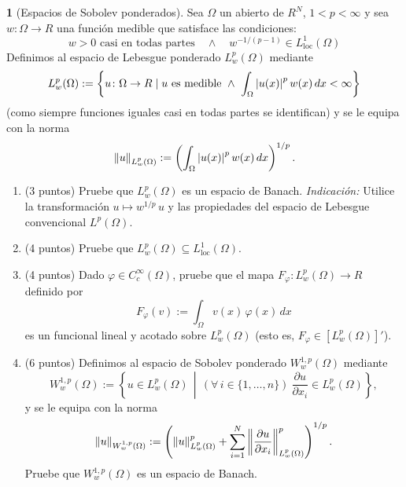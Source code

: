 \documentclass[10pt,a4paper]{report}
\newcommand{\abs}[2][y]{\if#1y\left\fi\lvert#2\if#1y\right\fi\rvert}
\newcommand{\norm}[2][y]{{\if#1y\left\fi\lVert#2\if#1y\right\fi\rVert}}
\newcommand{\dd}{\,d}
\theoremstyle{definition}
\newtheorem{problem}{\color{azul}{Problema}}
\renewcommand{\theproblem}{\Alph{problem}}
\numberwithin{equation}{problem}
\providecommand{\abs}[1]{\left\lvert#1\right\rvert}
\providecommand{\norm}[1]{\left\lVert#1\right\rVert}
\begin{document}
    \begin{problem}[Espacios de Sobolev ponderados]
    	Sea $\Omega$ un abierto de $R^N$, $1 < p < \infty$ y sea $w\colon \Omega \to R$ una función medible que satisface las condiciones:
    	\begin{equation*}
    		w > 0 \text{ casi en todas partes} \quad \wedge \quad w^{-1/(p-1)} \in L^1_{\mathrm{loc}}(\Omega)
    	\end{equation*}
    	Definimos al espacio de Lebesgue ponderado $L^p_w(\Omega)$ mediante
    	\begin{equation*}
    		L^p_w(\Omega) := \left\{ u \colon \Omega \to R \mid \text{$u$ es medible} \ \wedge \ \int_\Omega \abs{u(x)}^p w(x) \dd x < \infty \right\}
    	\end{equation*}
    	(como siempre funciones iguales casi en todas partes se identifican) y se le equipa con la norma
    	\begin{equation*}
    		\norm{u}_{L^p_w(\Omega)} := \left( \int_\Omega \abs{u(x)}^p w(x) \dd x \right)^{1/p}.
    	\end{equation*}
    	\begin{enumerate}[label=\textbf{\theproblem.\arabic{*}.},ref=\theproblem.\arabic{*},parsep=1ex]
    		\item\label{q:weightedLebesgueBanach} (3 puntos) Pruebe que $L^p_w(\Omega)$ es un espacio de Banach.
    		\emph{Indicación:} Utilice la transformación $u \mapsto w^{1/p} \, u$ y las propiedades del espacio de Lebesgue convencional $L^p(\Omega)$.
    		\item\label{q:weightedLebesgueIsLocallyIntegrable} (4 puntos) Pruebe que $L^p_w(\Omega) \subseteq L^1_{\mathrm{loc}}(\Omega)$.
    		\item\label{q:AFunctionalOnWeightedLebesgue} (4 puntos) Dado $\varphi \in C^\infty_c(\Omega)$, pruebe que el mapa $F_\varphi \colon L^p_w(\Omega) \to R$ definido por
    		\begin{equation*}
    			F_\varphi(v) := \int_\Omega v(x) \, \varphi(x) \dd x
    		\end{equation*}
    		es un funcional lineal y acotado sobre $L^p_w(\Omega)$ (esto es, $F_\varphi \in [L^p_w(\Omega)]'$).
    		\item\label{q:weightedSobolevBanach} (6 puntos) Definimos al espacio de Sobolev ponderado $W^{1,p}_w(\Omega)$ mediante
    		\begin{equation*}
    			W^{1,p}_w(\Omega) := \left\{ u \in L^p_w(\Omega) \,\middle|\, (\forall\,i\in\{1,\dotsc,n\})\ \frac{\partial u}{\partial x_i} \in L^p_w(\Omega) \right\},
    		\end{equation*}
    		y se le equipa con la norma
    		\begin{equation*}
    			\norm{u}_{W^{1,p}_w(\Omega)} := \left( \norm{u}_{L^p_w(\Omega)}^p + \sum_{i=1}^N \norm{\frac{\partial u}{\partial x_i}}_{L^p_w(\Omega)}^p \right)^{1/p}.
    		\end{equation*}
    		Pruebe que $W^{1,p}_w(\Omega)$ es un espacio de Banach.
    	\end{enumerate}
    \end{problem}
\end{document}

